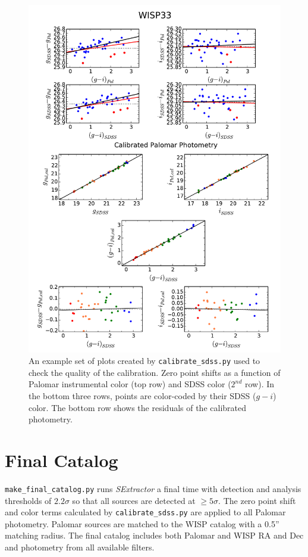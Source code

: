 \documentclass{article}
\begin{document}
\begin{figure}
\begin{center}
\includegraphics[scale=0.8]{sdss_calibration.pdf}
\caption{An example set of plots created by \texttt{calibrate\_sdss.py}
used to check the quality of the calibration. Zero point
shifts as a function of Palomar instrumental color (top row) and SDSS color 
($2^{nd}$ row). In the bottom three rows, points are color-coded by their
SDSS ($g-i$) color. The bottom row shows the residuals of the calibrated
photometry.
\label{fig:cals}
}
\end{center}
\end{figure}

\vspace{4 mm}
\section{Final Catalog}
\texttt{make\_final\_catalog.py} runs \textit{SExtractor} a final time
with detection and analysis thresholds of $2.2\sigma$ so that all sources
are detected at $\geq5\sigma$. The zero point shift and color terms 
calculated by \texttt{calibrate\_sdss.py} are applied to all Palomar
photometry. Palomar sources are matched to the WISP catalog with a 0.5''
matching radius. The final catalog includes both Palomar and WISP
RA and Dec and photometry from all available filters.\\
\end{document}
